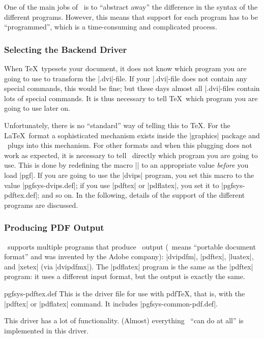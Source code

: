 One of the main jobs of \pgfname\ is to ``abstract away'' the difference in the
syntax of the different programs. However, this means that support for each
program has to be ``programmed'', which is a time-consuming and complicated
process.


\subsubsection{Selecting the Backend Driver}

When \TeX\ typesets your document, it does not know which program you are going
to use to transform the |.dvi|-file. If your |.dvi|-file does not contain any
special commands, this would be fine; but these days almost all |.dvi|-files
contain lots of special commands. It is thus necessary to tell \TeX\ which
program you are going to use later on.

Unfortunately, there is no ``standard'' way of telling this to \TeX. For the
\LaTeX\ format a sophisticated mechanism exists inside the |graphics| package
and \pgfname\ plugs into this mechanism. For other formats and when this
plugging does not work as expected, it is necessary to tell \pgfname\ directly
which program you are going to use. This is done by redefining the macro
|\pgfsysdriver| to an appropriate value \emph{before} you load |pgf|. If you
are going to use the |dvips| program, you set this macro to the value
|pgfsys-dvips.def|; if you use |pdftex| or |pdflatex|, you set it to
|pgfsys-pdftex.def|; and so on. In the following, details of the support of the
different programs are discussed.


\subsubsection{Producing PDF Output}

\pgfname\ supports multiple programs that produce \pdf\ output (\pdf\ means
``portable document format'' and was invented by the Adobe company): |dvipdfm|,
|pdftex|, |luatex|, and |xetex| (via |dvipdfmx|). The |pdflatex| program is the
same as the |pdftex| program: it uses a different input format, but the output
is exactly the same.

\begin{filedescription}{pgfsys-pdftex.def}
    This is the driver file for use with pdf\TeX, that is, with the |pdftex| or
    |pdflatex| command. It includes |pgfsys-common-pdf.def|.

    This driver has a lot of functionality. (Almost) everything \pgfname\ ``can
    do at all'' is implemented in this driver.
\end{filedescription}

